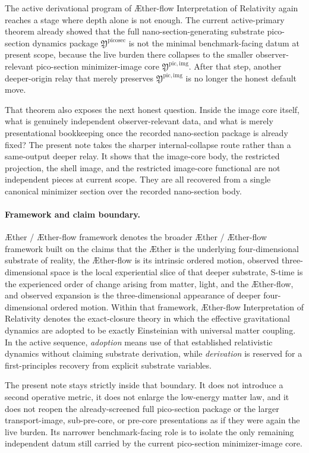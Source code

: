 \documentclass[11pt]{article}
\newcommand{\Aether}{\AE{}ther}
\newcommand{\Aflow}{\AE{}ther-flow}
\newcommand{\TheoryName}{\Aflow{} Interpretation of Relativity}
\newcommand{\TheoryProgram}{\Aether{} / \Aflow{} framework}
\newcommand{\PicoSectionPackage}{\mathfrak Y^{\mathrm{picosec}}}
\newcommand{\PicoImageCore}{\mathfrak Y^{\mathrm{pic,img}}}
\begin{document}
The active derivational program of \TheoryName{} again reaches a stage where depth alone is not enough. The current active-primary theorem already showed that the full nano-section-generating substrate pico-section dynamics package \(\PicoSectionPackage\) is not the minimal benchmark-facing datum at present scope, because the live burden there collapses to the smaller observer-relevant pico-section minimizer-image core \(\PicoImageCore\). After that step, another deeper-origin relay that merely preserves \(\PicoImageCore\) is no longer the honest default move.

That theorem also exposes the next honest question. Inside the image core itself, what is genuinely independent observer-relevant data, and what is merely presentational bookkeeping once the recorded nano-section package is already fixed? The present note takes the sharper internal-collapse route rather than a same-output deeper relay. It shows that the image-core body, the restricted projection, the shell image, and the restricted image-core functional are not independent pieces at current scope. They are all recovered from a single canonical minimizer section over the recorded nano-section body.

\paragraph{Framework and claim boundary.}
\TheoryProgram{} denotes the broader \Aether{} / \Aflow{} framework built on the claims that the \Aether{} is the underlying four-dimensional substrate of reality, the \Aflow{} is its intrinsic ordered motion, observed three-dimensional space is the local experiential slice of that deeper substrate, S-time is the experienced order of change arising from matter, light, and the \Aflow{}, and observed expansion is the three-dimensional appearance of deeper four-dimensional ordered motion. Within that framework, \TheoryName{} denotes the exact-closure theory in which the effective gravitational dynamics are adopted to be exactly Einsteinian with universal matter coupling. In the active sequence, \emph{adoption} means use of that established relativistic dynamics without claiming substrate derivation, while \emph{derivation} is reserved for a first-principles recovery from explicit substrate variables.

The present note stays strictly inside that boundary. It does not introduce a second operative metric, it does not enlarge the low-energy matter law, and it does not reopen the already-screened full pico-section package or the larger transport-image, sub-pre-core, or pre-core presentations as if they were again the live burden. Its narrower benchmark-facing role is to isolate the only remaining independent datum still carried by the current pico-section minimizer-image core.
\end{document}
